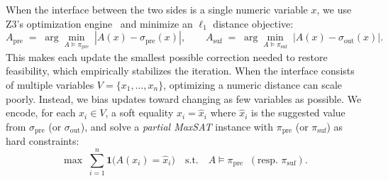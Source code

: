 \documentclass[acmsmall,screen,nonacm]{acmart}
\theoremstyle{definition}
\begin{document}
When the interface between the two sides is a single numeric variable \(x\), we use Z3’s optimization engine~\cite{bjorner2015nuz} and minimize an \(\ell_1\) distance objective:
\[
A_{\mathrm{pre}} \;=\; \arg\min_{A \models \pi_{\mathrm{pre}}}\; |A(x)-\sigma_{\mathrm{pre}}(x)|,
\qquad
A_{\mathrm{suf}} \;=\; \arg\min_{A \models \pi_{\mathrm{suf}}}\; |A(x)-\sigma_{\mathrm{out}}(x)|.
\]
This makes each update the smallest possible correction needed to restore feasibility, which empirically stabilizes the iteration. When the interface consists of multiple variables \(V=\{x_1,\ldots,x_n\}\), optimizing a numeric distance can scale poorly. Instead, we bias updates toward changing as few variables as possible. We encode, for each \(x_i \in V\), a soft equality \(x_i=\hat x_i\) where \(\hat x_i\) is the suggested value from \(\sigma_{\mathrm{pre}}\) (or \(\sigma_{\mathrm{out}}\)), and solve a \emph{partial MaxSAT} instance with \(\pi_{\mathrm{pre}}\) (or \(\pi_{\mathrm{suf}}\)) as hard constraints:
\[
\max\;\sum_{i=1}^n \mathbf{1}\bigl(A(x_i)=\hat x_i\bigr)
\quad\text{s.t.}\quad A \models \pi_{\mathrm{pre}} \;\;(\text{resp. } \pi_{\mathrm{suf}}).
\]
\end{document}
